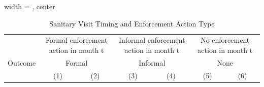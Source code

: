 
\begin{table}[htbp]
   
   \caption{\label{tab:sanitary_visit_enforcement_type_iterative} Sanitary Visit Timing and Enforcement Action Type}
   \bigskip
   
   \centering
   
   \begin{adjustbox}{width = \textwidth, center}
      
      
      \begin{tabular}{lcccccc}
         \toprule
         
          & \multicolumn{2}{c}{Formal enforcement action in month t} & \multicolumn{2}{c}{Informal enforcement action in month t} & \multicolumn{2}{c}{No enforcement action in month t}\\
         
         Outcome & \multicolumn{2}{c}{Formal} & \multicolumn{2}{c}{Informal} & \multicolumn{2}{c}{None} \\ 
         
                                            & (1)            & (2)                     & (3)            & (4)            & (5)             & (6)\\  
         

\end{tabular}
\end{adjustbox}
\end{table}

